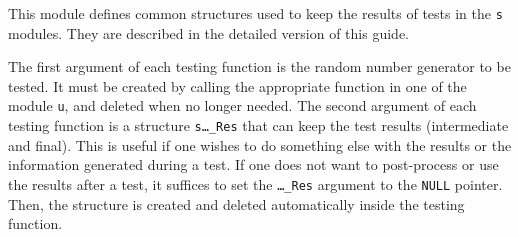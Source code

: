 
This module defines common structures used to keep the results of tests
in the {\tt s} modules. They are described in the detailed version of
this guide.


The first argument of each testing function is the random number generator 
to be tested. It must be created by calling the appropriate function
in one of the module {\tt u}, and deleted when no longer needed.
The second argument of each testing function is a structure 
{\tt s\ldots\_Res} that can keep the test results (intermediate and final).
This is useful if one wishes to do something else with the
results or the information generated during a test. 
If one does not want to post-process or use the results after a test,
it suffices to set the {\tt \ldots\_Res} argument to the {\tt NULL} pointer.
Then, the structure is created and deleted automatically inside the 
testing function.
